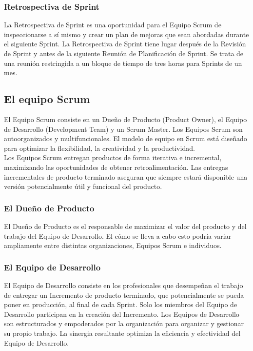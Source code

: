   \subsubsection{Retrospectiva de Sprint}
  La Retrospectiva de Sprint es una oportunidad para el Equipo Scrum de inspeccionarse a sí mismo y crear un plan de mejoras que sean abordadas durante el siguiente Sprint. La Retrospectiva de Sprint tiene lugar después de la Revisión de Sprint y antes de la siguiente Reunión de Planificación de Sprint. Se trata de una reunión restringida a un bloque de tiempo de tres horas para Sprints de un mes.
  
  \subsection{El equipo Scrum}
  El Equipo Scrum consiste en un Dueño de Producto (Product Owner), el Equipo de Desarrollo (Development Team) y un Scrum Master. Los Equipos Scrum son autoorganizados y multifuncionales. El modelo de equipo en Scrum está diseñado para optimizar la flexibilidad, la creatividad y la productividad. \\
  
  Los Equipos Scrum entregan productos de forma iterativa e incremental, maximizando las oportunidades de obtener retroalimentación. Las entregas incrementales de producto terminado aseguran que siempre estará disponible una versión potencialmente útil y funcional del producto. \cite{ref2} 
  
  \subsubsection{El Dueño de Producto}
  El Dueño de Producto es el responsable de maximizar el valor del producto y del trabajo del Equipo de Desarrollo. El cómo se lleva a cabo esto podría variar ampliamente entre distintas organizaciones, Equipos Scrum e individuos.
  
  \subsubsection{El Equipo de Desarrollo}
  El Equipo de Desarrollo consiste en los profesionales que desempeñan el trabajo de entregar un Incremento de producto terminado, que potencialmente se pueda poner en producción, al final de cada Sprint. Solo los miembros del Equipo de Desarrollo participan en la creación del Incremento. Los Equipos de Desarrollo son estructurados y empoderados por la organización para organizar y gestionar su propio trabajo. La sinergia resultante optimiza la eficiencia y efectividad del Equipo de Desarrollo.
  
